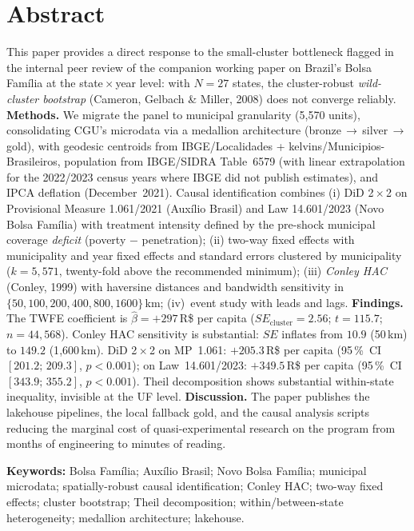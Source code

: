 \documentclass[12pt,a4paper,oneside]{article}
\begin{document}
\section*{Abstract}
\begin{singlespace}\small\noindent
This paper provides a direct response to the small-cluster bottleneck
flagged in the internal peer review of the companion working paper on
Brazil's Bolsa Família at the state\,$\times$\,year level: with
$N = 27$ states, the cluster-robust \textit{wild-cluster bootstrap}
(Cameron, Gelbach \& Miller, 2008) does not converge reliably.
\textbf{Methods.} We migrate the panel to municipal granularity
(5{,}570 units), consolidating CGU's microdata via a medallion
architecture (bronze\,$\rightarrow$\,silver\,$\rightarrow$\,gold), with
geodesic centroids from IBGE/Localidades + kelvins/Municipios-Brasileiros,
population from IBGE/SIDRA Table~6579 (with linear extrapolation for the
2022/2023 census years where IBGE did not publish estimates), and IPCA
deflation (December~2021). Causal identification combines (i) DiD
2\,$\times$\,2 on Provisional Measure 1.061/2021 (Auxílio Brasil) and
Law 14.601/2023 (Novo Bolsa Família) with treatment intensity defined by
the pre-shock municipal coverage \textit{deficit} (poverty $-$
penetration); (ii) two-way fixed effects with municipality and year
fixed effects and standard errors clustered by municipality
($k = 5{,}571$, twenty-fold above the recommended minimum); (iii)
\textit{Conley HAC} (Conley, 1999) with haversine distances and
bandwidth sensitivity in $\{50, 100, 200, 400, 800, 1600\}$\,km;
(iv)~event study with leads and lags. \textbf{Findings.} The
TWFE coefficient is $\hat{\beta} = +297$\,R\$ per capita
($SE_{\text{cluster}} = 2.56$; $t = 115.7$; $n = 44{,}568$). Conley HAC
sensitivity is substantial: $SE$ inflates from $10.9$ (50\,km) to
$149.2$ (1{,}600\,km). DiD 2\,$\times$\,2 on MP~1.061: $+205.3$\,R\$
per capita (95\,\%~CI~$[201.2;\,209.3]$, $p < 0.001$); on
Law~14.601/2023: $+349.5$\,R\$ per capita (95\,\%~CI~$[343.9;\,355.2]$,
$p < 0.001$). Theil decomposition shows substantial within-state
inequality, invisible at the UF level. \textbf{Discussion.} The paper
publishes the lakehouse pipelines, the local fallback gold, and the
causal analysis scripts \textemdash{} reducing the marginal cost of
quasi-experimental research on the program from months of engineering
to minutes of reading.

\vspace{0.4cm}\noindent\textbf{Keywords:}
Bolsa Família; Auxílio Brasil; Novo Bolsa Família; municipal microdata;
spatially-robust causal identification; Conley HAC; two-way fixed
effects; cluster bootstrap; Theil decomposition; within/between-state
heterogeneity; medallion architecture; lakehouse.
\end{singlespace}
\end{document}
